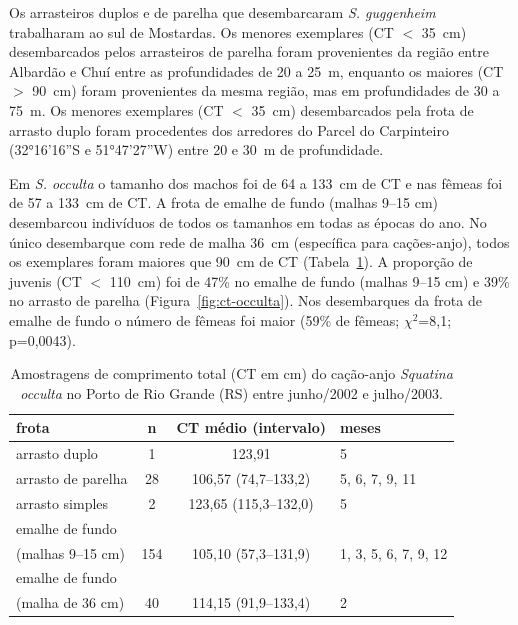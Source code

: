 \documentclass[a4paper,11pt,twoside,showtrims,onecolumn,openright,final]{memoir}
\begin{document}
Os arrasteiros duplos e de parelha que desembarcaram \emph{S. guggenheim} trabalharam ao sul 
de Mostardas. Os menores exemplares  (CT $<$ 35~cm) desembarcados pelos arrasteiros de 
parelha foram provenientes da região entre Albardão e Chuí entre as profundidades 
de 20 a 25~m, enquanto os maiores (CT $>$ 90~cm) foram provenientes da mesma região, 
mas em profundidades de 30 a 75~m. Os menores exemplares (CT $<$ 35~cm) desembarcados 
pela frota de arrasto duplo foram procedentes dos arredores do Parcel do 
Carpinteiro (32°16'16''S e 51°47'27''W) entre 20 e 30~m de profundidade. 

Em \emph{S. occulta} o tamanho dos machos foi de 64 a 133~cm de CT e nas fêmeas 
foi de 57 a 133~cm de CT. A frota de emalhe de fundo (malhas 9--15 cm) desembarcou 
indivíduos de todos os tamanhos em todas as épocas do ano.  No único desembarque 
com rede de malha 36~cm (específica para cações-anjo), todos os exemplares foram 
maiores que 90~cm de CT (Tabela~\ref{tab:ct-occulta}). 
A proporção de juvenis (CT $<$ 110~cm) foi de 47\% no emalhe de fundo (malhas 9--15 cm) 
e 39\% no arrasto de parelha (Figura~\ref{fig:ct-occulta}). 
Nos desembarques da frota de emalhe de fundo o número de fêmeas foi 
maior (59\% de fêmeas; $\chi^2$=8,1; p=0,0043).

\begin{table}
\caption[Amostragens de comprimento total do cação-anjo \emph{Squatina occulta}]
        {Amostragens de comprimento total (CT em cm) do cação-anjo \emph{Squatina occulta} no 
         Porto de Rio Grande (RS) entre junho/2002 e julho/2003.}
\label{tab:ct-occulta}
\begin{center}
\begin{tabular*}{\textwidth}{l@{\extracolsep{\fill}}ccl}
\toprule
frota			& n		& CT médio (intervalo)		& meses			\\
\midrule
arrasto duplo		& 1		& 123,91			& 5			\\
arrasto de parelha	& 28		& 106,57 (74,7--133,2)		& 5, 6, 7, 9, 11	\\
arrasto simples		& 2		& 123,65 (115,3--132,0)		& 5			\\
emalhe de fundo		&		&				&			\\
(malhas 9--15 cm)	& 154		& 105,10 (57,3--131,9)		& 1, 3, 5, 6, 7, 9, 12	\\
emalhe de fundo		&		&				&			\\
(malha de 36 cm)	& 40		& 114,15 (91,9--133,4)		& 2			\\
\bottomrule
\end{tabular*}
\end{center}
\end{table}
\end{document}
